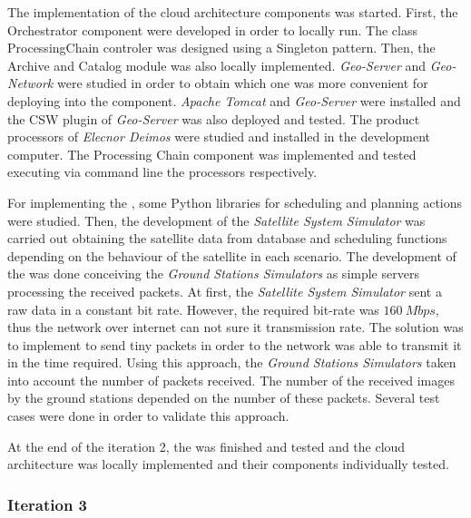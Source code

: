 The implementation of the cloud architecture components was started. First, the
Orchestrator component were developed in order to locally run. The class
ProcessingChain controler was designed using a Singleton pattern. Then, the
Archive and Catalog module was also locally implemented. \emph{Geo-Server} and
\emph{Geo-Network} were studied in order to obtain which one was more convenient
for deploying into the component. \emph{Apache Tomcat} and \emph{Geo-Server}
were installed and the \ac{CSW} plugin of \emph{Geo-Server} was also deployed
and tested.
The product processors of \emph{Elecnor Deimos} were studied and installed in
the development computer. The Processing Chain component was implemented and
tested executing
via command line the processors respectively.

For implementing the \sss, some Python libraries for scheduling and planning
actions were studied. Then, the development of the \emph{Satellite System
  Simulator} was carried out obtaining the satellite data from database and
scheduling functions depending on the behaviour of the satellite in each
scenario.
The development of the \gsss was done conceiving the \emph{Ground Stations
  Simulators} as simple servers processing the received packets.   
At first, the \emph{Satellite System Simulator}  sent a raw data in a constant
bit rate. However, the required bit-rate was $160~Mbps$, thus the network over internet
can not sure it transmission rate. The solution was to implement to send tiny
packets in order to the network was able to transmit it in the time required.    
Using this approach, the \emph{Ground Stations
  Simulators} taken into account the number of packets received. The number of
the received images by the ground stations depended on
the number of these packets. Several test cases were done in order to validate
this approach.

At the end of the iteration 2, the \sss was finished and tested and the cloud
architecture was locally implemented and their components individually tested.
 
\subsubsection{Iteration 3}

